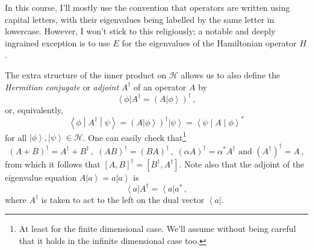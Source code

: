 \documentclass{article}
\theoremstyle{plain}\theoremheaderfont{\normalfont\itshape}\theorembodyfont{\rmfamily}\theoremseparator{.}\newtheorem*{rem}{Remark}\newtheorem*{ex}{Example}\newtheorem*{proof}{Proof}\newtheorem*{altp}{Alternative proof}
\theoremstyle{plain}\theoremheaderfont{\normalfont\bfseries}\theorembodyfont{\rmfamily}\theoremseparator{.}\newtheorem{thm}{Theorem}[section]\newtheorem{lem}[thm]{Lemma}\newtheorem{prop}[thm]{Proposition}\newtheorem*{cor}{Corollary}\newtheorem{defn}[thm]{Definition}\newtheorem{clm}[thm]{Claim}\newtheorem{clminproof}{Claim}
\theoremstyle{break}\theoremheaderfont{\normalfont\itshape}\theorembodyfont{\rmfamily}\theoremseparator{.\medskip}\newtheorem*{proofskip}{Proof}\newtheorem*{exs}{Examples}\newtheorem*{rems}{Remarks}
\theoremstyle{break}\theoremheaderfont{\normalfont\bfseries}\theorembodyfont{\rmfamily}\theoremseparator{.\medskip}\newtheorem{lemskip}[thm]{Lemma}\newtheorem{defnskip}[thm]{Definition}\newtheorem{propskip}[thm]{Proposition}\newtheorem{thmskip}[thm]{Theorem}
\numberwithin{equation}{section}
\newcommand{\bra}[1]{\left\langle #1 \right|}
\newcommand{\ket}[1]{\left| #1 \right\rangle}
\newcommand{\mel}[3]{\left\langle #1 \middle| #2 \middle| #3 \right\rangle}
\newcommand{\hb}{\mathcal{H}}
\begin{document}
    In this course, I'll mostly use the convention that operators are written using capital letters, with their eigenvalues being labelled by the same letter in lowercase. However, I won't stick to this religiously; a notable and deeply ingrained exception is to use \(E\) for the eigenvalues of the Hamiltonian operator \(H\).

    The extra structure of the inner product on \(\hb\) allows us to also define the \textit{Hermitian conjugate} or \textit{adjoint} \(A^\dagger\) of an operator \(A\) by
    \begin{equation}
        \bra{\phi}A^\dagger=\left(A\ket{\phi}\right)^\dagger\,,
    \end{equation}
    or, equivalently,
    \begin{equation}
        \mel{\phi}{A^\dagger}{\psi}=\left(A\ket{\phi}\right)^\dagger\ket{\psi}=\mel{\psi}{A}{\phi}^*
    \end{equation}
    for all \(\ket{\phi},\ket{\psi}\in\hb\). One can easily check that\footnote{At least for the finite dimensional case. We'll assume without being careful that it holds in the infinite dimensional case too.}
    \begin{equation}
        (A+B)^\dagger=A^\dagger+B^\dagger\,,\;(AB)^\dagger=(BA)^\dagger\,,\;(\alpha A)^\dagger=\alpha^*A^\dagger\text{ and }(A^\dagger)^\dagger=A\,,
    \end{equation}
    from which it follows that \([A,B]^\dagger=[B^\dagger,A^\dagger]\). Note also that the adjoint of the eigenvalue equation \(A\ket{a}=a\ket{a}\) is
    \begin{equation}
        \bra{a}A^\dagger=\bra{a}a^*\,,
    \end{equation}
    where \(A^\dagger\) is taken to act to the left on the dual vector \(\bra{a}\).
\end{document}
